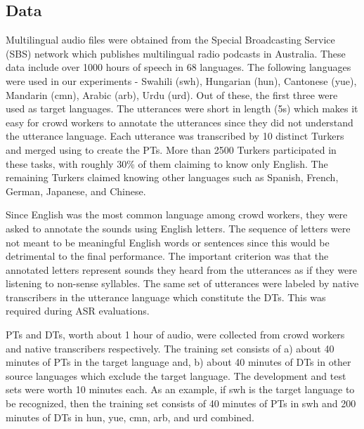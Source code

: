 \documentclass[a4paper]{article}
\begin{document}
\subsection{Data} \vspace{-2mm}
\label{sec:Data}
Multilingual audio files were obtained from the Special Broadcasting Service (SBS) network which publishes multilingual radio podcasts in Australia. These data include over 1000 hours of speech in 68 languages.
The following languages were used in our experiments - Swahili (swh), Hungarian (hun), Cantonese (yue), Mandarin (cmn), Arabic (arb), Urdu (urd). Out of these, the first three were used as target languages. %
The utterances were short in length (5s) which makes it easy for crowd workers to annotate the utterances since they did not understand the utterance language. Each utterance was transcribed by 10 distinct Turkers and merged using \cite{Jyothi-MismatchedCrowdsourcingTrans} to create the PTs. More than 2500 Turkers participated in these tasks, with roughly 30\% of them claiming to know only English. The remaining Turkers claimed knowing other languages such as Spanish, French, German, Japanese, and Chinese.

Since English was the most common language among crowd workers, they were asked to annotate the sounds using English letters. The sequence of letters were not meant to be meaningful English words or sentences since this would be detrimental to the final performance. The important criterion was that the annotated letters represent sounds they heard from the utterances as if they were listening to non-sense syllables. The same set of utterances were labeled by native transcribers in the utterance language which constitute the DTs. This was required during ASR evaluations.

PTs and DTs, worth about 1 hour of audio, were collected from crowd workers and native transcribers respectively. The training set consists of a) about 40 minutes of PTs in the target language and, b) about 40 minutes of DTs in other source languages which exclude the target language. The development and test sets were worth 10 minutes each. As an example, if swh is the target language to be recognized, then the training set consists of 40 minutes of PTs in swh and 200 minutes of DTs in hun, yue, cmn, arb, and urd combined.
\end{document}
